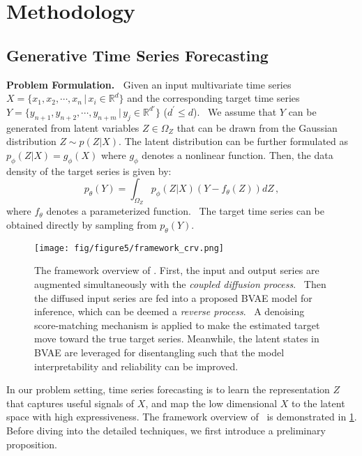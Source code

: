 \section{Methodology} 
\label{sec:method}

\subsection{Generative Time Series Forecasting}

{\bf Problem Formulation.~}
Given an input multivariate time series $X = \{x_1, x_2, \cdots, x_n \,|\, x_i \in \mathbb{R}^{d} \} $ and the corresponding target time series $ Y = \{y_{n+1}, y_{n+2}, \cdots , y_{n+m} \,|\, y_j \in \mathbb{R}^{d'} \}$ ($ d^{'} \leq d $).~%
We assume that $Y$ can be generated from latent variables $Z \in \Omega_Z$ that can be drawn from the Gaussian distribution $Z \sim p(Z|X)$. 
The latent distribution can be further formulated as $ p_\phi(Z|X) = g_\phi(X) $ where  $g_\phi $ denotes a nonlinear function.
Then, the data density of the target series is given by:
\begin{equation}
p_\theta(Y) = \int_{\Omega_Z} p_\phi(Z|X)( Y - f_\theta(Z) ) dZ \, ,
\end{equation}
where $f_\theta$ denotes a parameterized function.~%
The target time series can be obtained directly  by sampling from  $p_\theta(Y)$. 

\begin{figure}[t]
    \centering
    \texttt{[image: fig/figure5/framework\_crv.png]}
    \caption{
    The framework overview of \ourmodel. 
    First, the input and output series are augmented simultaneously with the {\em coupled diffusion process}.~%
    Then the diffused input series are fed into a proposed BVAE model for inference, which can be deemed a {\em reverse process}.~%
    A denoising score-matching mechanism is applied to make the estimated target move toward the true target series. 
    Meanwhile, the latent states in BVAE are leveraged for disentangling such that the model interpretability and reliability can be improved.
    }	
    \label{fig:method:framework}
\end{figure}

In our problem setting, 
time series forecasting is to learn the representation $Z$ that captures useful signals of $X$, 
and map the low dimensional $X$ to the latent space with high expressiveness. 
The framework overview of \ourmodel ~is demonstrated in \cref{fig:method:framework}. 
Before diving into the detailed techniques, we first introduce a preliminary proposition. 

